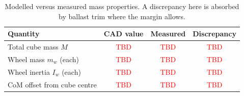 \begin{table}[htbp]
\centering
\caption[Modelled versus measured mass properties]{Modelled versus measured mass properties. A discrepancy here is
absorbed by ballast trim where the margin allows.}
\label{tab:mass_verification}
\small
\begin{tabular}{L{4.6cm} c c c}
\toprule
Quantity & CAD value & Measured & Discrepancy \\
\midrule
Total cube mass $M$          & \textcolor{red}{TBD} & \textcolor{red}{TBD} & \textcolor{red}{TBD} \\
Wheel mass $m_w$ (each)      & \textcolor{red}{TBD} & \textcolor{red}{TBD} & \textcolor{red}{TBD} \\
Wheel inertia $I_w$ (each)   & \textcolor{red}{TBD} & \textcolor{red}{TBD} & \textcolor{red}{TBD} \\
CoM offset from cube centre  & \textcolor{red}{TBD} & \textcolor{red}{TBD} & \textcolor{red}{TBD} \\
\bottomrule
\end{tabular}
\end{table}
